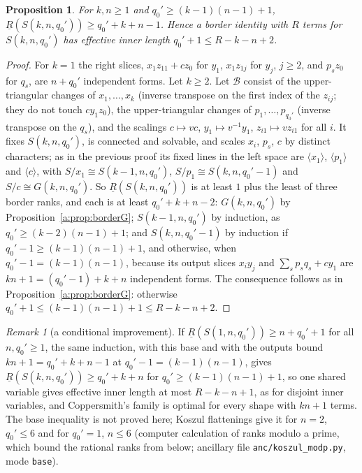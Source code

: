 \documentclass[11pt]{article}
\newtheorem{proposition}[theorem]{Proposition}
\theoremstyle{definition}
\theoremstyle{remark}
\newtheorem{remark}[theorem]{Remark}
\begin{document}
\begin{proposition}\label{a:prop:borderS}
For $k,n\ge1$ and $q_0'\ge(k-1)(n-1)+1$, $\underline R(S(k,n,q_0'))\ge q_0'+k+n-1$. Hence a border identity with $R$ terms for $S(k,n,q_0')$ has effective inner length $q_0'+1\le R-k-n+2$.
\end{proposition}

\begin{proof}
For $k=1$ the right slices, $x_1z_{11}+cz_0$ for $y_1$, $x_1z_{1j}$ for $y_j$, $j\ge2$, and $p_sz_0$ for $q_s$, are $n+q_0'$ independent forms. Let $k\ge2$. Let $\mathcal B$ consist of the upper-triangular changes of $x_1,\dots,x_k$ (inverse transpose on the first index of the $z_{ij}$; they do not touch $cy_1z_0$), the upper-triangular changes of $p_1,\dots,p_{q_0'}$ (inverse transpose on the $q_s$), and the scalings $c\mapsto vc$, $y_1\mapsto v^{-1}y_1$, $z_{i1}\mapsto vz_{i1}$ for all $i$. It fixes $S(k,n,q_0')$, is connected and solvable, and scales $x_i$, $p_s$, $c$ by distinct characters; as in the previous proof its fixed lines in the left space are $\langle x_1\rangle$, $\langle p_1\rangle$ and $\langle c\rangle$, with $S/x_1\cong S(k-1,n,q_0')$, $S/p_1\cong S(k,n,q_0'-1)$ and $S/c\cong G(k,n,q_0')$. So $\underline R(S(k,n,q_0'))$ is at least $1$ plus the least of three border ranks, and each is at least $q_0'+k+n-2$: $G(k,n,q_0')$ by Proposition~\ref{a:prop:borderG}; $S(k-1,n,q_0')$ by induction, as $q_0'\ge(k-2)(n-1)+1$; and $S(k,n,q_0'-1)$ by induction if $q_0'-1\ge(k-1)(n-1)+1$, and otherwise, when $q_0'-1=(k-1)(n-1)$, because its output slices $x_iy_j$ and $\sum_sp_sq_s+cy_1$ are $kn+1=(q_0'-1)+k+n$ independent forms. The consequence follows as in Proposition~\ref{a:prop:borderG}: otherwise $q_0'+1\le(k-1)(n-1)+1\le R-k-n+2$.
\end{proof}

\begin{remark}[a conditional improvement]\label{a:rem:conditional}
If $\underline R(S(1,n,q_0'))\ge n+q_0'+1$ for all $n,q_0'\ge1$, the same induction, with this base and with the outputs bound $kn+1=q_0'+k+n-1$ at $q_0'-1=(k-1)(n-1)$, gives $\underline R(S(k,n,q_0'))\ge q_0'+k+n$ for $q_0'\ge(k-1)(n-1)+1$, so one shared variable gives effective inner length at most $R-k-n+1$, as for disjoint inner variables, and Coppersmith's family is optimal for every shape with $kn+1$ terms. The base inequality is not proved here; Koszul flattenings give it for $n=2$, $q_0'\le6$ and for $q_0'=1$, $n\le6$ (computer calculation of ranks modulo a prime, which bound the rational ranks from below; ancillary file \texttt{anc/koszul\_modp.py}, mode \texttt{base}).
\end{remark}
\end{document}

